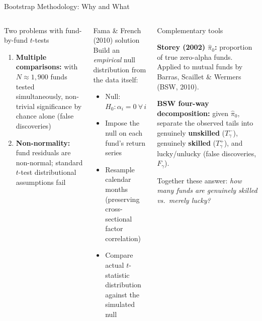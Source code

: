 \documentclass[aspectratio=169,10pt]{beamer}
\newcommand{\red}[1]{\textcolor{AlertRed}{\textbf{#1}}}
\newcommand{\green}[1]{\textcolor{SkillGreen}{\textbf{#1}}}
\begin{document}
\begin{frame}{Bootstrap Methodology: Why and What}
\begin{columns}[T]
\begin{block}{Two problems with fund-by-fund $t$-tests}
\begin{enumerate}
  \item \textbf{Multiple comparisons:} with $N \approx 1{,}900$ funds tested simultaneously, non-trivial significance by chance alone (false discoveries)
  \item \textbf{Non-normality:} fund residuals are non-normal; standard $t$-test distributional assumptions fail
\end{enumerate}
\end{block}

\begin{block}{Fama \& French (2010) solution}
Build an \emph{empirical} null distribution from the data itself:
{\footnotesize
\begin{itemize}
  \item Null: $H_0\!: \alpha_i = 0\ \forall\, i$
  \item Impose the null on each fund's return series
  \item Resample calendar months (preserving cross-sectional factor correlation)
  \item Compare actual $t$-statistic distribution against the simulated null
\end{itemize}}
\end{block}

\begin{block}{Complementary tools}
{\footnotesize \textbf{Storey (2002) $\hat{\pi}_0$:} proportion of true zero-alpha funds. Applied to mutual funds by Barras, Scaillet \& Wermers (BSW, 2010).

\smallskip
\textbf{BSW four-way decomposition:} given $\hat{\pi}_0$, separate the observed tails into genuinely \red{unskilled} ($T^-_\gamma$), genuinely \green{skilled} ($T^+_\gamma$), and lucky/unlucky (false discoveries, $F_\gamma$).

\smallskip
Together these answer: \emph{how many funds are genuinely skilled vs.\ merely lucky?}}
\end{block}
\end{columns}
\end{frame}
\end{document}
